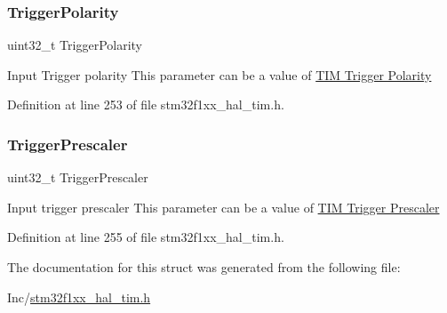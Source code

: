 \subsubsection{\texorpdfstring{Trigger\+Polarity}{TriggerPolarity}}
{\footnotesize\ttfamily uint32\+\_\+t Trigger\+Polarity}

Input Trigger polarity This parameter can be a value of \hyperlink{group___t_i_m___trigger___polarity}{T\+IM Trigger Polarity} 

Definition at line 253 of file stm32f1xx\+\_\+hal\+\_\+tim.\+h.

\mbox{\label{struct_t_i_m___slave_config_type_def_aa2906798e3808ed40ac203a741512b55}} 
\subsubsection{\texorpdfstring{Trigger\+Prescaler}{TriggerPrescaler}}
{\footnotesize\ttfamily uint32\+\_\+t Trigger\+Prescaler}

Input trigger prescaler This parameter can be a value of \hyperlink{group___t_i_m___trigger___prescaler}{T\+IM Trigger Prescaler} 

Definition at line 255 of file stm32f1xx\+\_\+hal\+\_\+tim.\+h.



The documentation for this struct was generated from the following file\+:\begin{DoxyCompactItemize}
\item 
Inc/\hyperlink{stm32f1xx__hal__tim_8h}{stm32f1xx\+\_\+hal\+\_\+tim.\+h}\end{DoxyCompactItemize}
